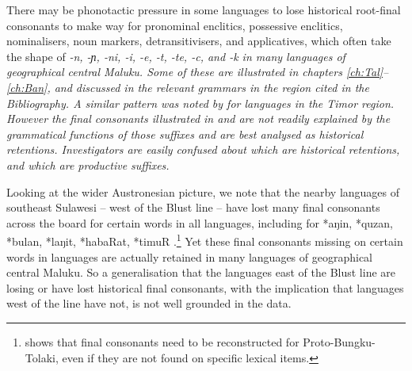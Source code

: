 There may be phonotactic pressure in some languages to lose historical
root-final consonants to make way for pronominal enclitics,
possessive enclitics, nominalisers, noun markers, detransitivisers,
and applicatives, which often take the shape of \it{-n,
-ɲ, -ni, -i, -e,
-t, -te, -c}, and \it{-k} in many languages of geographical central Maluku.
Some of these are illustrated in chapters \ref{ch:Tal}--\ref{ch:Ban},
and discussed in the relevant grammars in the region cited in the Bibliography.
A similar pattern was noted by \citet{Jonker1906} for languages
in the Timor region.
However the final consonants illustrated in 
and  are not readily explained by the grammatical functions
of those suffixes and are best analysed as historical retentions.
Investigators are easily confused about which are historical
retentions, and which are productive suffixes.

Looking at the wider Austronesian picture,
we note that the nearby  languages of southeast
Sulawesi -- west of the Blust line -- have lost many final consonants
across the board for certain words in all languages,
including for *aŋin, *quzan,
*bulan, *laŋit, *habaRat, *timuR \citep[103--178]{Mead1999}.\footnote{
		\citet{Mead1996}
		shows that final consonants need to be reconstructed for Proto-Bungku-Tolaki,
		even if they are not found on specific lexical items.}
Yet these final consonants missing on certain words in 
languages are actually retained in many languages of geographical central Maluku.
So a generalisation that the languages east of the Blust line
are losing or have lost historical final consonants,
with the implication that languages west of the line have not,
is not well grounded in the data.


